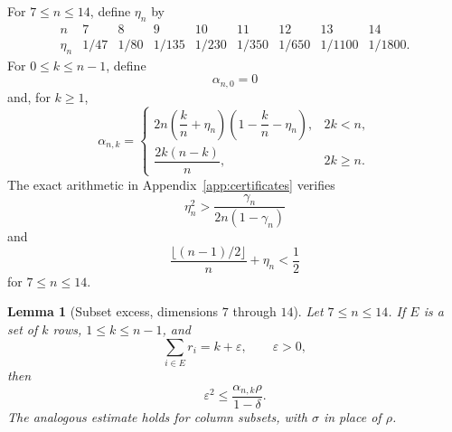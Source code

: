 \documentclass[11pt,a4paper]{article}
\numberwithin{equation}{section}
\newtheorem{lemma}[theorem]{Lemma}
\theoremstyle{definition}
\newcommand{\1}{\mathbf{1}}
\newcommand{\eps}{\varepsilon}
\begin{document}
For $7\le n\le14$, define $\eta_n$ by
\begin{equation}\label{eq:eta-table}
\begin{array}{c|cccccccc}
 n&7&8&9&10&11&12&13&14\\ \hline
 \eta_n&1/47&1/80&1/135&1/230&1/350&1/650&1/1100&1/1800.
\end{array}
\end{equation}
For $0\le k\le n-1$, define
\[
 \alpha_{n,0}=0
\]
and, for $k\ge1$,
\begin{equation}\label{eq:alpha-mid}
 \alpha_{n,k}=
 \begin{cases}
  2n\left(\dfrac{k}{n}+\eta_n\right)
     \left(1-\dfrac{k}{n}-\eta_n\right),&2k<n,\\[3mm]
  \dfrac{2k(n-k)}n,&2k\ge n.
 \end{cases}
\end{equation}
The exact arithmetic in Appendix~\ref{app:certificates} verifies
\begin{equation}\label{eq:eta-localization}
 \eta_n^2>\frac{\gamma_n}{2n(1-\gamma_n)}
\end{equation}
and
\begin{equation}\label{eq:eta-half}
 \frac{\lfloor(n-1)/2\rfloor}{n}+\eta_n<\frac12
\end{equation}
for $7\le n\le14$.

\begin{lemma}[Subset excess, dimensions $7$ through $14$]\label{lem:subset-mid}
Let $7\le n\le14$.  If $E$ is a set of $k$ rows, $1\le k\le n-1$, and
\[
 \sum_{i\in E}r_i=k+\eps,
 \qquad \eps>0,
\]
then
\begin{equation}\label{eq:subset-mid}
 \eps^2\le\frac{\alpha_{n,k}\rho}{1-\delta}.
\end{equation}
The analogous estimate holds for column subsets, with $\sigma$ in place of $\rho$.
\end{lemma}
\end{document}
